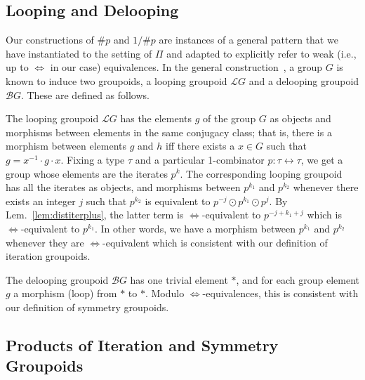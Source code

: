 \documentclass[a4paper,USenglish]{lipics-v2016-utf8x}
\newcommand{\hash}{\#}
\newcommand{\iso}{\leftrightarrow}
\newcommand{\isotwo}{\Leftrightarrow}
\newcommand{\order}[1]{\hash #1}
\newcommand{\iorder}[1]{1/\hash #1}
\newcommand{\looping}[1]{\mathcal{L}{#1}}
\newcommand{\delooping}[1]{\mathcal{B}{#1}}
\begin{document}
\subsection{Looping and Delooping}

Our constructions of $\order{p}$ and $\iorder{p}$ are instances of a general
pattern that we have instantiated to the setting of $\Pi$ and adapted to
explicitly refer to weak (i.e., up to $\isotwo$ in our case) equivalences. In
the general construction~\cite{looping}, a group $G$ is known to induce two
groupoids, a looping groupoid $\looping{G}$ and a delooping groupoid
$\delooping{G}$. These are defined as follows.

The looping groupoid $\looping{G}$ has the elements $g$ of the group $G$ as
objects and morphisms between elements in the same conjugacy class; that is,
there is a
morphism between elements $g$ and $h$ iff there exists a $x \in G$ such that
$g = x^{-1} \cdot g \cdot x$. Fixing a type $\tau$ and a particular 1-combinator
$p : \tau \iso \tau$, we get a group whose elements are the iterates $p^k$. The
corresponding looping groupoid has all the iterates as objects, and morphisms
between $p^{k_1}$ and $p^{k_2}$ whenever there exists an integer $j$ such that
$p^{k_2}$ is equivalent to $p^{-j} \odot p^{k_1} \odot p^{j}$. By
Lem.~\ref{lem:distiterplus}, the latter term is $\isotwo$-equivalent to
$p^{-j+k_1+j}$ which is $\isotwo$-equivalent to $p^{k_1}$. In other words, we
have a morphism between $p^{k_1}$ and $p^{k_2}$ whenever they are
$\isotwo$-equivalent which is consistent with our definition of iteration
groupoids.

The delooping groupoid $\delooping{G}$ has one trivial element $\ast$, and for
each group element $g$ a morphism (loop) from $\ast$ to $\ast$. Modulo
$\isotwo$-equivalences, this is consistent with our definition of symmetry
groupoids.

\subsection{Products of Iteration and Symmetry Groupoids}
\label{sub:products}
\end{document}
